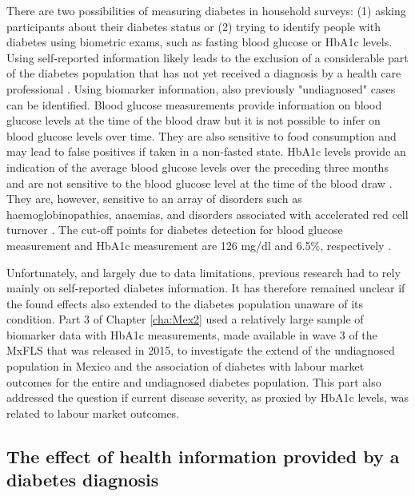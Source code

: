 There are two possibilities of measuring diabetes in household surveys: (1) asking participants about their diabetes status or (2) trying to identify people with diabetes using biometric exams, such as fasting blood glucose or \ac{HbA1c} levels. Using self-reported information likely leads to the exclusion of a considerable part of the diabetes population that has not yet received a diagnosis by a health care professional \parencite{Beagley2014}. Using biomarker information, also previously "undiagnosed" cases can be identified. Blood glucose measurements provide information on blood glucose levels at the time of the blood draw but it is not possible to infer on blood glucose levels over time. They are also sensitive to food consumption and may lead to false positives if taken in a non-fasted state. \ac{HbA1c} levels provide an indication of the average blood glucose levels over the preceding three months and are not sensitive to the blood glucose level at the time of the blood draw \parencite{WorldHealthOrganization2011}. They are, however, sensitive to an array of disorders such as haemoglobinopathies, anaemias, and disorders associated with accelerated red cell turnover \parencite{WorldHealthOrganization2011}. The cut-off points for diabetes detection for blood glucose measurement and \ac{HbA1c} measurement are 126 mg/dl and 6.5\%, respectively \parencite{WorldHealthOrganization2006,WorldHealthOrganization2011}.

Unfortunately, and largely due to data limitations, previous research had to rely mainly on self-reported diabetes information. It has therefore remained unclear if the found effects also extended to the diabetes population unaware of its condition. Part 3 of Chapter \ref{cha:Mex2} used a relatively large sample of biomarker data with \ac{HbA1c} measurements, made available in wave 3 of the \ac{MxFLS} that was released in 2015, to investigate the extend of the undiagnosed population in Mexico and the association of diabetes with labour market outcomes for the entire and undiagnosed diabetes population. This part also addressed the question if current disease severity, as proxied by \ac{HbA1c} levels, was related to labour market outcomes.

\subsection{The effect of health information provided by a diabetes diagnosis}

